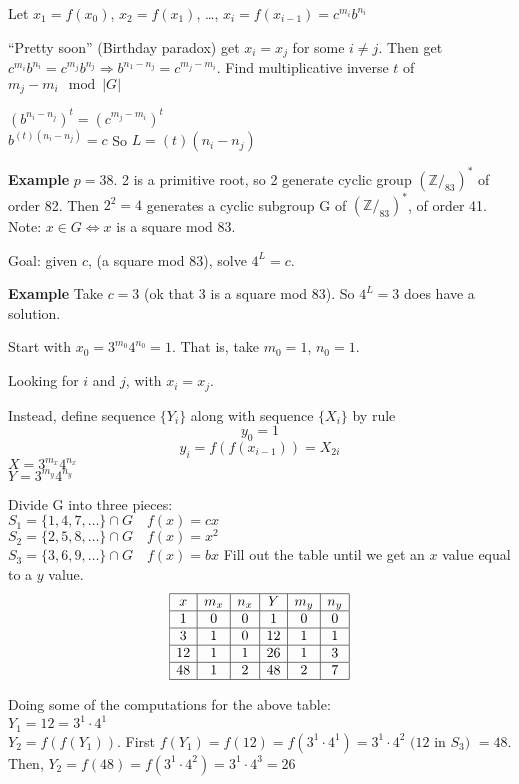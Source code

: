 Let $x_1 = f(x_0)$, $x_2 = f(x_1)$, \ldots, $x_i = f(x_{i-1}) = c^{m_i}b^{n_i}$

``Pretty soon'' (Birthday paradox)  get $x_i = x_j$ for some $i \neq j$. Then get $c^{m_i}b^{n_i} = c^{m_j}b^{n_j} \Rightarrow b^{n_1 - n_j} = c^{m_j - m_i}$. Find multiplicative inverse $t$ of $m_j-m_i \mod |G|$

$(b^{n_i-n_j})^t = (c^{m_j-m_i})^t$\\
$b^{(t)(n_i-n_j)} = c$ So $L = (t)(n_i-n_j)$

\textbf{Example} $p = 38$. 2 is a primitive root, so 2 generate cyclic group $(\mathbb{Z}/_{83})^*$ of order 82. Then $2^2 = 4$ generates a cyclic subgroup G of $(\mathbb{Z}/_{83})^*$, of order 41. Note: $x \in G \iff x$ is a square mod 83.

Goal: given $c$, (a square mod 83), solve $4^L = c$.

\textbf{Example} Take $c = 3$ (ok that 3 is a square mod 83). So $4^L = 3$ does have a solution.

Start with $x_0 = 3^{m_0}4^{n_0} = 1$. That is, take $m_0 = 1$, $n_0 = 1$.

Looking for $i$ and $j$, with $x_i = x_j$.

Instead, define sequence $\{Y_i\}$ along with sequence $\{X_i\}$ by rule
\[
y_0 = 1  \]\[
y_i = f(f(x_{i-1})) = X_{2i}
\]
$X = 3^{m_x}4^{n_x}$\\
$Y = 3^{m_y}4^{n_y}$

Divide G into three pieces:\\
$S_1 = \{1,4,7,\ldots\} \cap G \quad f(x) = cx$ \\
$S_2 = \{2,5,8,\ldots\} \cap G \quad f(x) = x^2$ \\
$S_3 = \{3,6,9,\ldots\} \cap G \quad f(x) = bx$
Fill out the table until we get an $x$ value equal to a $y$ value.
\[
\begin{array}{|c|c|c|c|c|c|} \hline
	x & m_x & n_x & Y & m_y & n_y \\ \hline
	1 & 0 & 0 & 1 & 0 & 0 \\ \hline
	3 & 1 & 0 & 12 & 1 & 1 \\ \hline
	12 & 1 & 1 & 26 & 1 & 3 \\ \hline
	48 & 1 & 2 & 48 & 2 & 7 \\ \hline
\end{array}
\]

Doing some of the computations for the above table:\\
$Y_1 = 12 = 3^1 \cdot 4^1$ \\
$Y_2 = f(f(Y_1))$. First $f(Y_1) = f(12) = f(3^1 \cdot 4^1) = 3^1 \cdot 4^2 \mbox{ (12 in $S_3$) } = 48$. Then, $Y_2 = f(48) = f(3^1 \cdot 4^2) = 3^1 \cdot 4^3 = 26$

